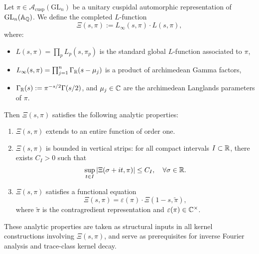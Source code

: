 \begin{definition}
\label{def:analytic_properties_XiPi}
Let \( \pi \in \mathcal{A}_{\mathrm{cusp}}(\mathrm{GL}_n) \) be a unitary cuspidal automorphic representation of \( \mathrm{GL}_n(\mathbb{A}_{\mathbb{Q}}) \). We define the completed \( L \)-function
\[
\Xi(s, \pi) := L_\infty(s, \pi) \cdot L(s, \pi),
\]
where:
\begin{itemize}
  \item \( L(s, \pi) = \prod_p L_p(s, \pi_p) \) is the standard global \( L \)-function associated to \( \pi \),
  \item \( L_\infty(s, \pi) = \prod_{j = 1}^n \Gamma_{\mathbb{R}}(s - \mu_j) \) is a product of archimedean Gamma factors,
  \item \( \Gamma_{\mathbb{R}}(s) := \pi^{-s/2} \Gamma(s/2) \), and \( \mu_j \in \mathbb{C} \) are the archimedean Langlands parameters of \( \pi \).
\end{itemize}

Then \( \Xi(s, \pi) \) satisfies the following analytic properties:
\begin{enumerate}
  \item \( \Xi(s, \pi) \) extends to an entire function of order one.
  \item \( \Xi(s, \pi) \) is bounded in vertical strips: for all compact intervals \( I \subset \mathbb{R} \), there exists \( C_I > 0 \) such that
  \[
  \sup_{t \in I} \left|\Xi(\sigma + it, \pi)\right| \leq C_I, \quad \forall \sigma \in \mathbb{R}.
  \]
  \item \( \Xi(s, \pi) \) satisfies a functional equation
  \[
  \Xi(s, \pi) = \varepsilon(\pi) \cdot \Xi(1 - s, \widetilde{\pi}),
  \]
  where \( \widetilde{\pi} \) is the contragredient representation and \( \varepsilon(\pi) \in \mathbb{C}^\times \).
\end{enumerate}

These analytic properties are taken as structural inputs in all kernel constructions involving \( \Xi(s, \pi) \), and serve as prerequisites for inverse Fourier analysis and trace-class kernel decay.
\end{definition}
